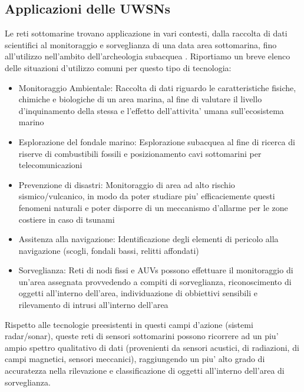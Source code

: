 \subsection{Applicazioni delle UWSNs}
Le reti sottomarine trovano applicazione in vari contesti, dalla raccolta di dati scientifici al monitoraggio e sorveglianza di una data area sottomarina, fino all'utilizzo nell'ambito dell'archeologia subacquea \cite{underwater}.\newline
Riportiamo un breve elenco delle situazioni d'utilizzo comuni per questo tipo di tecnologia:\newline
\begin{itemize}
\item Monitoraggio Ambientale:  \newline
Raccolta di dati riguardo le caratteristiche fisiche, chimiche e biologiche di un area marina, al fine di valutare il livello d'inquinamento della stessa e l'effetto dell'attivita' umana sull'ecosistema marino\newline
\item Esplorazione del fondale marino: \newline
Esplorazione subacquea al fine di ricerca di riserve di combustibili fossili e posizionamento cavi sottomarini per telecomunicazioni\newline
\item Prevenzione di disastri:\newline
Monitoraggio di area ad alto rischio sismico/vulcanico, in modo da poter studiare piu' efficaciemente questi fenomeni naturali e poter disporre di un meccanismo d'allarme per le zone costiere in caso di tsunami\newline
\item Assitenza alla navigazione: \newline
Identificazione degli elementi di pericolo alla navigazione (scogli, fondali bassi, relitti affondati)\newline
\item Sorveglianza:\newline
Reti di nodi fissi e AUVs possono effettuare il monitoraggio di un'area assegnata provvedendo a compiti di sorveglianza, riconoscimento di oggetti all'interno dell'area, individuazione di obbiettivi sensibili e rilevamento di intrusi all'interno dell'area
\end{itemize}
Rispetto alle tecnologie preesistenti in questi campi d'azione (sistemi radar/sonar), queste reti di sensori sottomarini possono ricorrere ad un piu' ampio spettro qualitativo di dati (provenienti da sensori acustici, di radiazioni, di campi magnetici, sensori meccanici), raggiungendo un piu' alto grado di accuratezza nella rilevazione e classificazione di oggetti all'interno dell'area di sorveglianza.\newline

